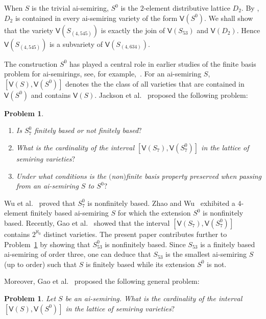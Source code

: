 \documentclass[reqno]{amsart}
\theoremstyle{plain}
\newtheorem{problem}[thm]{Problem}
\theoremstyle{definition}
\begin{document}
When $S$ is the trivial ai-semiring, $S^0$ is the $2$-element distributive lattice $D_2$.
By \cite[Proposition 1.4]{wrz}, $D_2$ is contained in every ai-semiring variety of the form $\mathsf{V}(S^0)$.
We shall show that the variety $\mathsf{V}(S_{(4, 545)})$ is exactly the join of $\mathsf{V}(S_{53})$ and $\mathsf{V}(D_{2})$.
Hence $\mathsf{V}(S_{(4, 545)})$ is a subvariety of $\mathsf{V}(S_{(4, 634)})$.

The construction $S^0$ has played a central role in earlier studies of the finite basis problem for ai-semirings,
see, for example,~\cite{gpz, pas05, rz16, rzs20, rzw}.
For an ai-semiring $S$, $[\mathsf{V}(S), \mathsf{V}(S^0)]$ denotes the
the class of all varieties that are contained in $\mathsf{V}(S^0)$ and contains $\mathsf{V}(S)$.
Jackson et al.~\cite[Problem 7.4]{jrz} proposed the following problem:
\begin{problem}\label{prob123}
\hspace*{\fill}
\begin{enumerate}[$(1)$]
\item Is $S_7^0$ finitely based or not finitely based$?$
\item What is the cardinality of the interval $[\mathsf{V}(S_7),\mathsf{V}(S_7^0)]$ in the lattice of semiring varieties$?$
\item Under what conditions is the $($non$)$finite basis property preserved when passing from an ai-semiring $S$ to $S^0$$?$
\end{enumerate}
\end{problem}

Wu et al.~\cite{wrz} proved that $S_7^0$ is nonfinitely based.
Zhao and Wu~\cite{zw} exhibited a $4$-element finitely based ai-semiring $S$ for which the extension $S^0$ is nonfinitely based.
Recently, Gao et al.~\cite{gjrz2} showed that the interval $[\mathsf{V}(S_7),\mathsf{V}(S_7^0)]$ contains $2^{\aleph_0}$ distinct varieties.
The present paper contributes further to Problem~\ref{prob123} by
showing that $S_{53}^0$ is nonfinitely based.
Since $S_{53}$ is a finitely based ai-semiring of order three,
one can deduce that $S_{53}$
is the smallest ai-semiring $S$ (up to order) such that $S$ is finitely based while its extension $S^0$ is not.

Moreover,
Gao et al.~\cite{gjrz2} proposed the following general problem:
\begin{problem}\label{prob1123}
Let $S$ be an ai-semiring. What is the cardinality of the interval $[\mathsf{V}(S),\mathsf{V}(S^0)]$ in the lattice of semiring varieties$?$
\end{problem}
\end{document}
